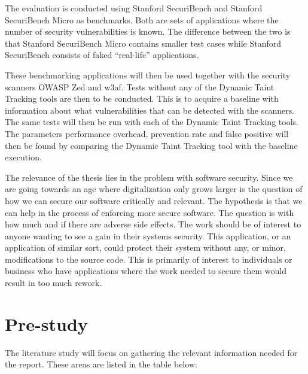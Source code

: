 \documentclass{../kththesis}
\begin{document}
	The evaluation is conducted using Stanford SecuriBench \parencite{securiBench} and Stanford SecuriBench Micro \parencite{securiBenchMicro} as benchmarks. Both are sets of applications where the number of security vulnerabilities is known. The difference between the two is that Stanford SecuriBench Micro contains smaller test cases while Stanford SecuriBench consists of faked “real-life” applications.

	These benchmarking applications will then be used together with the security scanners OWASP Zed and w3af. Tests without any of the Dynamic Taint Tracking tools are then to be conducted. This is to acquire a baseline with information about what vulnerabilities that can be detected with the scanners. The same tests will then be run with each of the Dynamic Taint Tracking tools. The parameters performance overhead, prevention rate and false positive will then be found by comparing the Dynamic Taint Tracking tool with the baseline execution.

	The relevance of the thesis lies in the problem with software security. Since we are going towards an age where digitalization only grows larger is the question of how we can secure our software critically and relevant. The hypothesis is that we can help in the process of enforcing more secure software. The question is with how much and if there are adverse side effects. The work should be of interest to anyone wanting to see a gain in their systems security. This application, or an application of similar sort, could protect their system without any, or minor, modifications to the source code. This is primarily of interest to individuals or business who have applications where the work needed to secure them would result in too much rework.
	
	
	
	\chapter{Pre-study} \label{Pre-study}
	The literature study will focus on gathering the relevant information needed for the report. These areas are listed in the table below:
			
\end{document}

